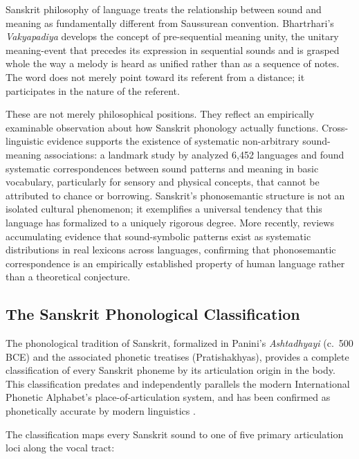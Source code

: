 \documentclass[12pt]{article}
\begin{document}
Sanskrit philosophy of language treats the relationship between sound and meaning as fundamentally different from Saussurean convention. Bhartrhari's \textit{Vakyapadiya} \citep{bhartrhari450} develops the concept of pre-sequential meaning unity, the unitary meaning-event that precedes its expression in sequential sounds and is grasped whole the way a melody is heard as unified rather than as a sequence of notes. The word does not merely point toward its referent from a distance; it participates in the nature of the referent.

These are not merely philosophical positions. They reflect an empirically examinable observation about how Sanskrit phonology actually functions. Cross-linguistic evidence supports the existence of systematic non-arbitrary sound-meaning associations: a landmark study by \citet{blasi2016} analyzed 6,452 languages and found systematic correspondences between sound patterns and meaning in basic vocabulary, particularly for sensory and physical concepts, that cannot be attributed to chance or borrowing. Sanskrit's phonosemantic structure is not an isolated cultural phenomenon; it exemplifies a universal tendency that this language has formalized to a uniquely rigorous degree. More recently, \citet{sidhu2025} reviews accumulating evidence that sound-symbolic patterns exist as systematic distributions in real lexicons across languages, confirming that phonosemantic correspondence is an empirically established property of human language rather than a theoretical conjecture.

\subsection{The Sanskrit Phonological Classification}

The phonological tradition of Sanskrit, formalized in Panini's \textit{Ashtadhyayi} (c.\ 500 BCE) \citep{cardona1997} and the associated phonetic treatises (Pratishakhyas), provides a complete classification of every Sanskrit phoneme by its articulation origin in the body. This classification predates and independently parallels the modern International Phonetic Alphabet's place-of-articulation system, and has been confirmed as phonetically accurate by modern linguistics \citep{allen1953}.

The classification maps every Sanskrit sound to one of five primary articulation loci along the vocal tract:
\end{document}
